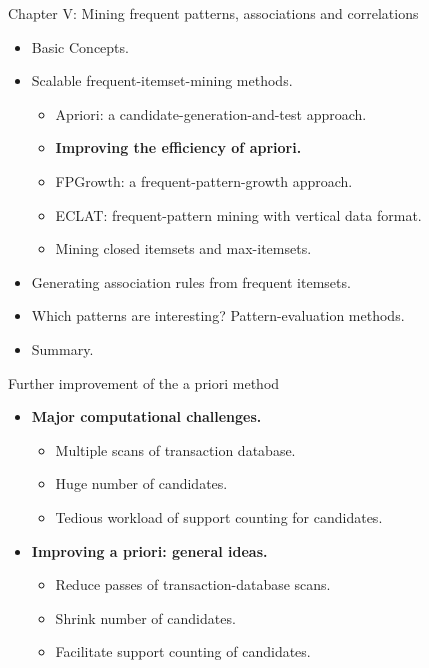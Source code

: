 \documentclass[aspectratio=169,t,xcolor=dvipsnames]{beamer}
\begin{document}
  {
    \begin{frame}{Chapter V: Mining frequent patterns, associations and correlations}
        \begin{itemize}
            \item Basic Concepts.
            \item Scalable frequent-itemset-mining methods.
            \begin{itemize}
              \item Apriori: a candidate-generation-and-test approach.
              \item \textbf{Improving the efficiency of apriori.}
              \item FPGrowth:  a frequent-pattern-growth approach.
              \item ECLAT: frequent-pattern mining with vertical data format.
              \item Mining closed itemsets and max-itemsets.
            \end{itemize}
            \item Generating association rules from frequent itemsets.
            \item Which patterns are interesting? Pattern-evaluation methods.
            \item Summary.
        \end{itemize}
    \end{frame}
  }

  {
    \begin{frame}{Further improvement of the a priori method}
        \begin{itemize}
            \item \textbf{Major computational challenges.}
              \begin{itemize}
                \item Multiple scans of transaction database.
                \item Huge number of candidates.
                \item Tedious workload of support counting for candidates.
              \end{itemize}
            \item \textbf{Improving a priori: general ideas.}
              \begin{itemize}
              \item Reduce passes of transaction-database scans.
              \item Shrink number of candidates.
              \item Facilitate support counting of candidates.
              \end{itemize}
        \end{itemize}
    \end{frame}
  }
\end{document}
